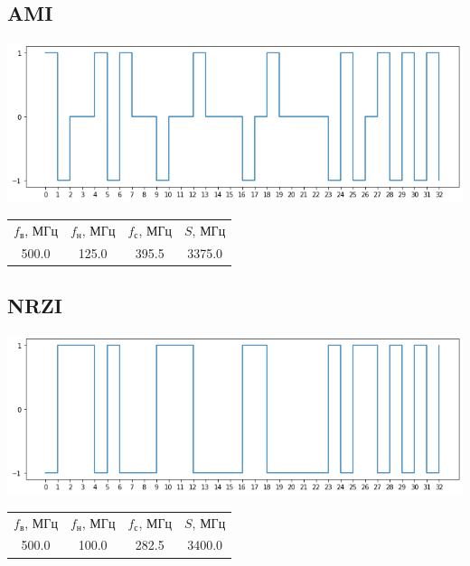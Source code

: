 \subsection{AMI}
\includegraphics[width=\textwidth]{3ami}
\begin{center}
    \begin{tabular}{cccc}
        $f_\mathrm{\text{в}}$, МГц & $f_\mathrm{\text{н}}$, МГц & $f_\mathrm{\text{с}}$, МГц & $S$, МГц \\
        500.0 & 125.0 & 395.5 & 3375.0 \\
    \end{tabular}
\end{center}

\subsection{NRZI}
\includegraphics[width=\textwidth]{3nrzi}
\begin{center}
    \begin{tabular}{cccc}
        $f_\mathrm{\text{в}}$, МГц & $f_\mathrm{\text{н}}$, МГц & $f_\mathrm{\text{с}}$, МГц & $S$, МГц \\
        500.0 & 100.0 & 282.5 & 3400.0 \\
    \end{tabular}
\end{center}

